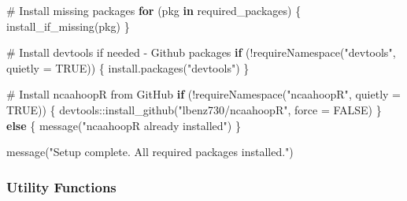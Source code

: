 \documentclass[
  letterpaper,
  DIV=11,
  numbers=noendperiod]{scrartcl}
\newenvironment{Shaded}{\begin{snugshade}}{\end{snugshade}}
\newcommand{\AttributeTok}[1]{\textcolor[rgb]{0.40,0.45,0.13}{#1}}
\newcommand{\CommentTok}[1]{\textcolor[rgb]{0.37,0.37,0.37}{#1}}
\newcommand{\ConstantTok}[1]{\textcolor[rgb]{0.56,0.35,0.01}{#1}}
\newcommand{\ControlFlowTok}[1]{\textcolor[rgb]{0.00,0.23,0.31}{\textbf{#1}}}
\newcommand{\FunctionTok}[1]{\textcolor[rgb]{0.28,0.35,0.67}{#1}}
\newcommand{\NormalTok}[1]{\textcolor[rgb]{0.00,0.23,0.31}{#1}}
\newcommand{\SpecialCharTok}[1]{\textcolor[rgb]{0.37,0.37,0.37}{#1}}
\newcommand{\StringTok}[1]{\textcolor[rgb]{0.13,0.47,0.30}{#1}}
\begin{document}
\begin{Shaded}
\begin{Highlighting}[]
\CommentTok{\# Install missing packages}
\ControlFlowTok{for}\NormalTok{ (pkg }\ControlFlowTok{in}\NormalTok{ required\_packages) \{}
  \FunctionTok{install\_if\_missing}\NormalTok{(pkg)}
\NormalTok{\}}

\CommentTok{\# Install devtools if needed {-} Github packages}
\ControlFlowTok{if}\NormalTok{ (}\SpecialCharTok{!}\FunctionTok{requireNamespace}\NormalTok{(}\StringTok{"devtools"}\NormalTok{, }\AttributeTok{quietly =} \ConstantTok{TRUE}\NormalTok{)) \{}
  \FunctionTok{install.packages}\NormalTok{(}\StringTok{"devtools"}\NormalTok{)}
\NormalTok{\}}

\CommentTok{\# Install ncaahoopR from GitHub}
\ControlFlowTok{if}\NormalTok{ (}\SpecialCharTok{!}\FunctionTok{requireNamespace}\NormalTok{(}\StringTok{"ncaahoopR"}\NormalTok{, }\AttributeTok{quietly =} \ConstantTok{TRUE}\NormalTok{)) \{}
\NormalTok{  devtools}\SpecialCharTok{::}\FunctionTok{install\_github}\NormalTok{(}\StringTok{"lbenz730/ncaahoopR"}\NormalTok{, }\AttributeTok{force =} \ConstantTok{FALSE}\NormalTok{)}
\NormalTok{\} }\ControlFlowTok{else}\NormalTok{ \{}
  \FunctionTok{message}\NormalTok{(}\StringTok{"ncaahoopR already installed"}\NormalTok{)}
\NormalTok{\}}


\FunctionTok{message}\NormalTok{(}\StringTok{"Setup complete. All required packages installed."}\NormalTok{)}
\end{Highlighting}
\end{Shaded}

\subsubsection{Utility Functions}\label{utility-functions}
\end{document}
